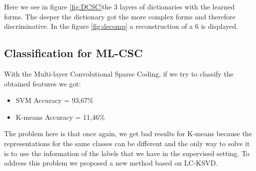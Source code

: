 Here we see in figure \ref{fig:DCSC}the 3 layers of dictionaries with the learned forms. The deeper the dictionary got the more complex forms and therefore discriminative. In the figure \ref{fig:decomp} a reconstruction of a 6 is displayed. 

\subsection{Classification for ML-CSC}

With the Multi-layer Convolutional Sparse Coding, if we try to classify the obtained features we got:
\begin{itemize}
 \item SVM Accuracy = 93,67\%
 \item K-means Accuracy = 11,46\%
\end{itemize}
The problem here is that once again, we get bad results for K-means because the representations for the same classes can be different and the only way to solve it is to use the information of the labels that we have in the supervised setting. To address this problem we proposed a new method based on LC-KSVD.
\newpage
